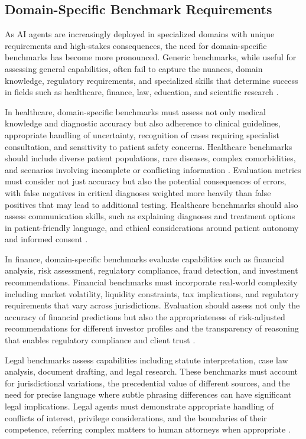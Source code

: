 \begin{TNtwocol}
\section{Domain-Specific Benchmark Requirements}
As AI agents are increasingly deployed in specialized domains with unique requirements and high-stakes consequences, the need for domain-specific benchmarks has become more pronounced. Generic benchmarks, while useful for assessing general capabilities, often fail to capture the nuances, domain knowledge, regulatory requirements, and specialized skills that determine success in fields such as healthcare, finance, law, education, and scientific research \cite{nori2023,thirunavukarasu2023,liu2023}.

In healthcare, domain-specific benchmarks must assess not only medical knowledge and diagnostic accuracy but also adherence to clinical guidelines, appropriate handling of uncertainty, recognition of cases requiring specialist consultation, and sensitivity to patient safety concerns. Healthcare benchmarks should include diverse patient populations, rare diseases, complex comorbidities, and scenarios involving incomplete or conflicting information \cite{nori2023,thirunavukarasu2023}. Evaluation metrics must consider not just accuracy but also the potential consequences of errors, with false negatives in critical diagnoses weighted more heavily than false positives that may lead to additional testing. Healthcare benchmarks should also assess communication skills, such as explaining diagnoses and treatment options in patient-friendly language, and ethical considerations around patient autonomy and informed consent \cite{thirunavukarasu2023,nori2023}.

In finance, domain-specific benchmarks evaluate capabilities such as financial analysis, risk assessment, regulatory compliance, fraud detection, and investment recommendations. Financial benchmarks must incorporate real-world complexity including market volatility, liquidity constraints, tax implications, and regulatory requirements that vary across jurisdictions. Evaluation should assess not only the accuracy of financial predictions but also the appropriateness of risk-adjusted recommendations for different investor profiles and the transparency of reasoning that enables regulatory compliance and client trust \cite{liu2023,thirunavukarasu2023}.

Legal benchmarks assess capabilities including statute interpretation, case law analysis, document drafting, and legal research. These benchmarks must account for jurisdictional variations, the precedential value of different sources, and the need for precise language where subtle phrasing differences can have significant legal implications. Legal agents must demonstrate appropriate handling of conflicts of interest, privilege considerations, and the boundaries of their competence, referring complex matters to human attorneys when appropriate \cite{jin2021}.


\end{TNtwocol}
